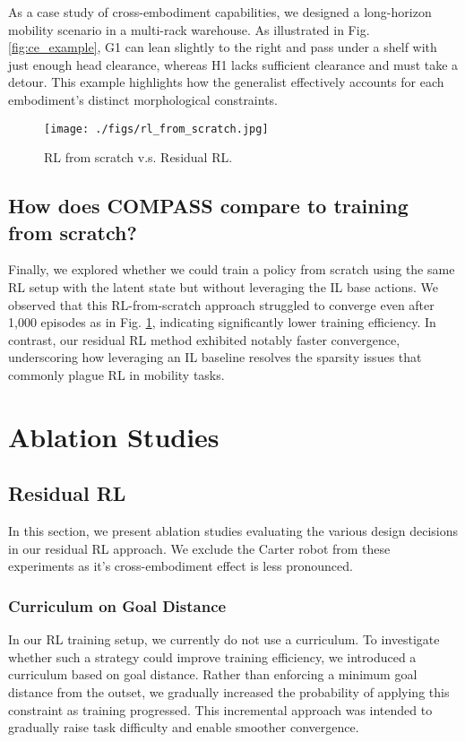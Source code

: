 \documentclass[letterpaper, 10 pt,conference]{ieeeconf}
\begin{document}
As a case study of cross-embodiment capabilities, we designed a long-horizon mobility scenario in a multi-rack warehouse. As illustrated in Fig. \ref{fig:ce_example}, G1 can lean slightly to the right and pass under a shelf with just enough head clearance, whereas H1 lacks sufficient clearance and must take a detour. This example highlights how the generalist effectively accounts for each embodiment’s distinct morphological constraints.

\begin{figure}[t] 
\begin{center} \centering\texttt{[image: ./figs/rl\_from\_scratch.jpg]} 
\caption{RL from scratch v.s. Residual RL.} 
\label{fig:rl_from_scratch} 
\end{center} 
\end{figure}

\subsection{How does COMPASS compare to training from scratch?}
Finally, we explored whether we could train a policy from scratch using the same RL setup with the latent state but without leveraging the IL base actions. We observed that this RL-from-scratch approach struggled to converge even after 1,000 episodes as in Fig. \ref{fig:rl_from_scratch}, indicating significantly lower training efficiency. In contrast, our residual RL method exhibited notably faster convergence, underscoring how leveraging an IL baseline resolves the sparsity issues that commonly plague RL in mobility tasks.

\section{Ablation Studies} \label{sec:ablation}

\subsection{Residual RL}
In this section, we present ablation studies evaluating the various design decisions in our residual RL approach. We exclude the Carter robot from these experiments as it's cross-embodiment effect is less pronounced.

\subsubsection{Curriculum on Goal Distance} 
In our RL training setup, we currently do not use a curriculum. To investigate whether such a strategy could improve training efficiency, we introduced a curriculum based on goal distance. Rather than enforcing a minimum goal distance from the outset, we gradually increased the probability of applying this constraint as training progressed. This incremental approach was intended to gradually raise task difficulty and enable smoother convergence.
\end{document}
